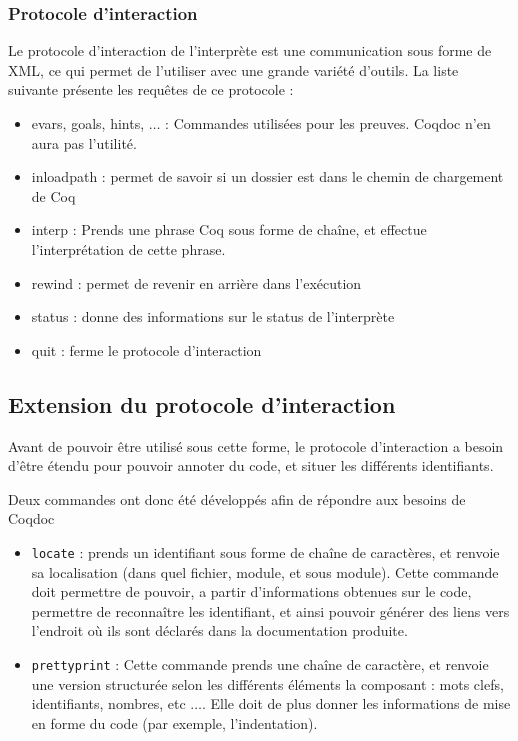 \documentclass[a4paper, 11pt]{report}
\begin{document}
    \subsubsection{Protocole d'interaction}
    Le protocole d'interaction de l'interprète est une communication sous forme
    de XML, ce qui permet de l'utiliser avec une grande variété d'outils.
    La liste suivante présente les requêtes de ce protocole :
    \begin{itemize}
      \item evars, goals, hints, $\ldots$ : Commandes utilisées pour les preuves.
      Coqdoc n'en aura pas l'utilité.
      \item inloadpath : permet de savoir si un dossier est dans le chemin
      de chargement de Coq
      \item interp : Prends une phrase Coq sous forme de chaîne, et effectue
      l'interprétation de cette phrase.
      \item rewind : permet de revenir en arrière dans l'exécution
      \item status : donne des informations sur le status de l'interprète
      \item quit : ferme le protocole d'interaction
    \end{itemize}

    \subsection{Extension du protocole d'interaction}
    Avant de pouvoir être utilisé sous cette forme, le protocole d'interaction
    a besoin d'être étendu pour pouvoir annoter du code, et situer les
    différents identifiants.

    Deux commandes ont donc été développés afin de répondre aux besoins de Coqdoc
    \begin{itemize}
      \item \texttt{locate} : prends un identifiant sous forme de chaîne de caractères,
      et renvoie sa localisation (dans quel fichier, module, et sous module).
      Cette commande doit permettre de pouvoir, a partir d'informations obtenues
      sur le code, permettre de reconnaître les identifiant, et ainsi pouvoir
     générer des liens vers l'endroit où ils sont déclarés dans la documentation
     produite.
      \item \texttt{prettyprint} :
      Cette commande prends une chaîne de caractère, et renvoie une version
      structurée selon les différents éléments la composant : mots clefs,
      identifiants, nombres, etc $\ldots$. Elle doit de plus donner
      les informations de mise en forme du code (par exemple, l'indentation).
    \end{itemize}
\end{document}
